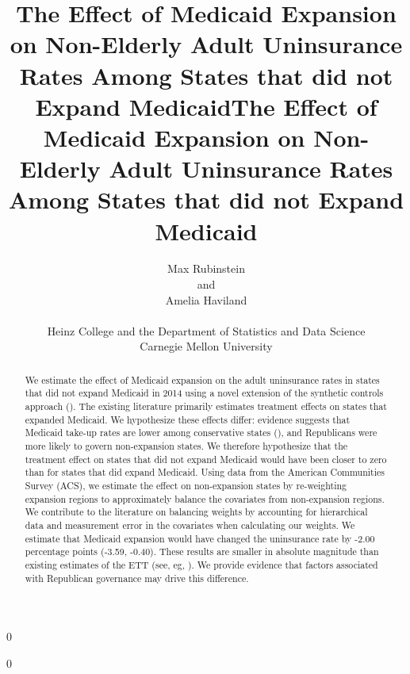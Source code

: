 \documentclass[12pt]{article}
\newcommand{\blind}{0}
\begin{document}
\blind
{
  \title{\bf The Effect of Medicaid Expansion on Non-Elderly Adult Uninsurance Rates Among States that did not Expand Medicaid}
  \author{Max Rubinstein \hspace{.2cm}\\
    and \\
    Amelia Haviland \\ \\
    Heinz College and the Department of Statistics and Data Science \\ Carnegie Mellon University}
  \maketitle
} \fi

\blind
{
  \bigskip
  \bigskip
  \bigskip
  \begin{center}
  \title{\bf The Effect of Medicaid Expansion on Non-Elderly Adult Uninsurance Rates Among States that did not Expand Medicaid}
\end{center}
  \medskip
} \fi

\bigskip

\begin{abstract}

We estimate the effect of Medicaid expansion on the adult uninsurance rates in states that did not expand Medicaid in 2014 using a novel extension of the synthetic controls approach (\cite{abadie2010synthetic}). The existing literature primarily estimates treatment effects on states that expanded Medicaid. We hypothesize these effects differ: evidence suggests that Medicaid take-up rates are lower among conservative states (\cite{sommers2012understanding}), and Republicans were more likely to govern non-expansion states. We therefore hypothesize that the treatment effect on states that did not expand Medicaid would have been closer to zero than for states that did expand Medicaid. Using data from the American Communities Survey (ACS), we estimate the effect on non-expansion states by re-weighting expansion regions to approximately balance the covariates from non-expansion regions. We contribute to the literature on balancing weights by accounting for hierarchical data and measurement error in the covariates when calculating our weights. We estimate that Medicaid expansion would have changed the uninsurance rate by -2.00 percentage points (-3.59, -0.40). These results are smaller in absolute magnitude than existing estimates of the ETT (see, eg, \cite{courtemanche2017early}). We provide evidence that factors associated with Republican governance may drive this difference.

\end{abstract}
\end{document}
